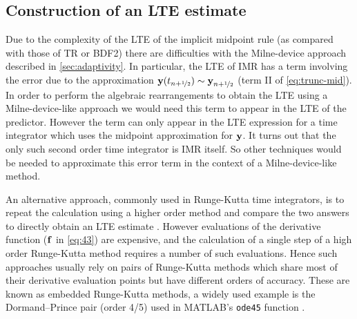 \subsection{Construction of an LTE estimate}

Due to the complexity of the LTE of the implicit midpoint rule (as compared with those of TR or BDF2) there are difficulties with the Milne-device approach described in \cref{sec:adaptivity}.
In particular, the LTE of IMR has a term involving the error due to the approximation $\boldsymbol{\mathrm{y}}(t_{n+\nicefrac{1}{2}}) \sim \boldsymbol{\mathrm{y}}_{n+\nicefrac{1}{2}}$ (term II of \cref{eq:trunc-mid}).
In order to perform the algebraic rearrangements to obtain the LTE using a Milne-device-like approach we would need this term to appear in the LTE of the predictor.
However the term can only appear in the LTE expression for a time integrator which uses the midpoint approximation for $\boldsymbol{\mathrm{y}}$.
It turns out that the only such second order time integrator is IMR itself.
So other techniques would be needed to approximate this error term in the context of a Milne-device-like method.

An alternative approach, commonly used in Runge-Kutta time integrators, is to repeat the calculation using a higher order method and compare the two answers to directly obtain an LTE estimate \cite[165]{HairerWanner}.
However evaluations of the derivative function (${\boldsymbol{\mathrm{f}}}$ in \cref{eq:43}) are expensive, and the calculation of a single step of a high order Runge-Kutta method requires a number of such evaluations.
Hence such approaches usually rely on pairs of Runge-Kutta methods which share most of their derivative evaluation points but have different orders of accuracy.
These are known as embedded Runge-Kutta methods, a widely used example is the Dormand–Prince pair (order 4/5) used in MATLAB's \texttt{ode45} function \cite{matlab-ode45}.

